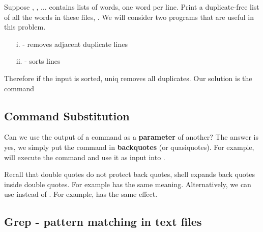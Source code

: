 \documentclass[english, 11pt]{article}
\begin{document}
  \begin{exmp}
    Suppose , , $\ldots$ contains lists of words, one word per line. Print a duplicate-free list of all the words in these files, . We will consider two programs that are useful in this problem.
    \begin{itemize}
      \item[i.]  - removes adjacent duplicate lines
      \item[ii.]  - sorts lines
    \end{itemize}
    Therefore if the input is sorted, uniq removes all duplicates. Our solution is the command
    \begin{center}
    \end{center}
  \end{exmp}

  \subsection{Command Substitution}

  Can we use the output of a command as a \textbf{parameter} of another? The answer is yes, we simply put the command in \textbf{backquotes} (or quasiquotes). For example, 
   will execute the  command and use it as input into .

   \begin{rem}
     Recall that double quotes do not protect back quotes, shell expands back quotes inside double quotes. For example  has the same meaning. Alternatively, we can use \tc{\$()} instead of . For example,  has the same effect.
   \end{rem}

   \subsection{Grep - pattern matching in text files}
\end{document}
